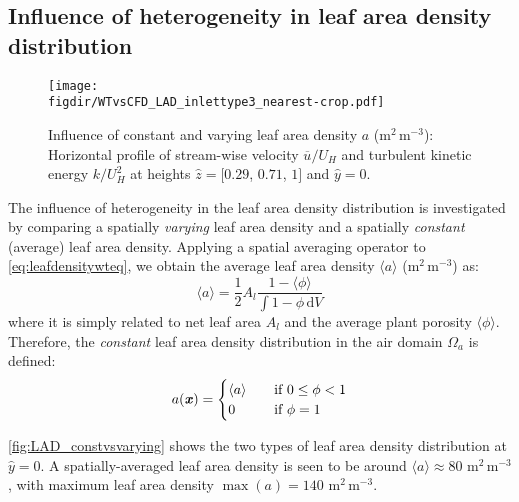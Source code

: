 \subsection{Influence of heterogeneity in leaf area density distribution}

\begin{figure}[p]
	\centering
	\texttt{[image: \\figdir/WTvsCFD\_LAD\_inlettype3\_nearest-crop.pdf]}
	\caption{Influence of constant and varying leaf area density $a$ (m$^2$\,m$^{-3}$): Horizontal profile of stream-wise velocity $\overline{u}/U_H$ and turbulent kinetic energy $k/U_H^2$ at heights $\hat{z} = [0.29$, $0.71$, $1]$ and $\hat{y}=0$.}
	\label{fig:WTvsCFD_LAD}
\end{figure}

The influence of heterogeneity in the leaf area density distribution is investigated by comparing a spatially \textit{varying} leaf area density and a spatially \textit{constant} (average) leaf area density. Applying a spatial averaging operator to \cref{eq:leafdensitywteq}, we obtain the average leaf area density $\langle a\rangle$  (m$^2$\,m$^{-3}$) as:
	\begin{equation}
	\langle a \rangle = \frac{1}{2} {A}_l \frac{1 - \langle \phi \rangle}{\int {1 - \phi }\,\mathrm{d}V}
	\label{eq:leafdensitywteqaverage}
	\end{equation} 
where it is simply related to net leaf area $A_l$ and the average plant porosity $\langle \phi \rangle$. Therefore, the \textit{constant} leaf area density distribution in the air domain $\Omega_a$ is defined:
\begin{equation}
a(\textbf{\textit{x}}) =
	\begin{cases}
	\langle a \rangle       	  & \quad \text{if}\ 0\le \phi < 1\\
	0  							  & \quad \text{if}\ \phi = 1
	\end{cases}
	\label{eq:leafdensitywteqaveragefield}
\end{equation}

\cref{fig:LAD_constvsvarying} shows the two types of leaf area density distribution at $\hat{y} = 0$. A spatially-averaged leaf area density is seen to be around $\langle a \rangle \approx 80$ m$^{2}$\,m$^{-3}$, with maximum leaf area density $\max (a) = 140$ m$^{2}$\,m$^{-3}$. %

	
